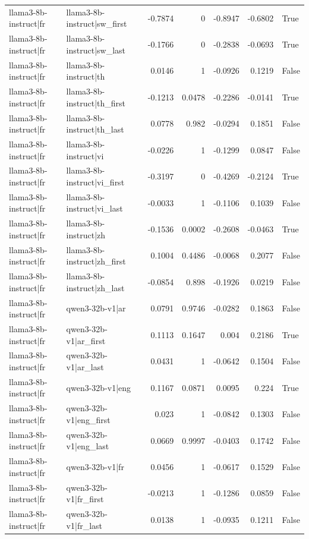 \begin{table}
\begin{tabular}{l l r r r r l}
llama3-8b-instruct|fr & llama3-8b-instruct|sw_first & -0.7874 & 0 & -0.8947 & -0.6802 & True \\
llama3-8b-instruct|fr & llama3-8b-instruct|sw_last & -0.1766 & 0 & -0.2838 & -0.0693 & True \\
llama3-8b-instruct|fr & llama3-8b-instruct|th & 0.0146 & 1 & -0.0926 & 0.1219 & False \\
llama3-8b-instruct|fr & llama3-8b-instruct|th_first & -0.1213 & 0.0478 & -0.2286 & -0.0141 & True \\
llama3-8b-instruct|fr & llama3-8b-instruct|th_last & 0.0778 & 0.982 & -0.0294 & 0.1851 & False \\
llama3-8b-instruct|fr & llama3-8b-instruct|vi & -0.0226 & 1 & -0.1299 & 0.0847 & False \\
llama3-8b-instruct|fr & llama3-8b-instruct|vi_first & -0.3197 & 0 & -0.4269 & -0.2124 & True \\
llama3-8b-instruct|fr & llama3-8b-instruct|vi_last & -0.0033 & 1 & -0.1106 & 0.1039 & False \\
llama3-8b-instruct|fr & llama3-8b-instruct|zh & -0.1536 & 0.0002 & -0.2608 & -0.0463 & True \\
llama3-8b-instruct|fr & llama3-8b-instruct|zh_first & 0.1004 & 0.4486 & -0.0068 & 0.2077 & False \\
llama3-8b-instruct|fr & llama3-8b-instruct|zh_last & -0.0854 & 0.898 & -0.1926 & 0.0219 & False \\
llama3-8b-instruct|fr & qwen3-32b-v1|ar & 0.0791 & 0.9746 & -0.0282 & 0.1863 & False \\
llama3-8b-instruct|fr & qwen3-32b-v1|ar_first & 0.1113 & 0.1647 & 0.004 & 0.2186 & True \\
llama3-8b-instruct|fr & qwen3-32b-v1|ar_last & 0.0431 & 1 & -0.0642 & 0.1504 & False \\
llama3-8b-instruct|fr & qwen3-32b-v1|eng & 0.1167 & 0.0871 & 0.0095 & 0.224 & True \\
llama3-8b-instruct|fr & qwen3-32b-v1|eng_first & 0.023 & 1 & -0.0842 & 0.1303 & False \\
llama3-8b-instruct|fr & qwen3-32b-v1|eng_last & 0.0669 & 0.9997 & -0.0403 & 0.1742 & False \\
llama3-8b-instruct|fr & qwen3-32b-v1|fr & 0.0456 & 1 & -0.0617 & 0.1529 & False \\
llama3-8b-instruct|fr & qwen3-32b-v1|fr_first & -0.0213 & 1 & -0.1286 & 0.0859 & False \\
llama3-8b-instruct|fr & qwen3-32b-v1|fr_last & 0.0138 & 1 & -0.0935 & 0.1211 & False \\

\end{tabular}
\end{table}

